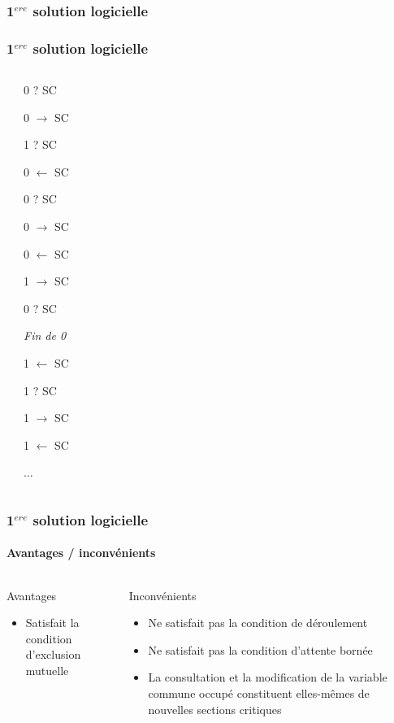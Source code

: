 \begin{frame}
\frametitle{1$^{ere}$ solution logicielle}
\begin{scriptsize}\end{scriptsize}
\end{frame}

\begin{frame}
\frametitle{1$^{ere}$ solution logicielle}
\begin{columns}
\begin{scriptsize}\end{scriptsize}
\begin{itemize}
\begin{scriptsize}
\item 0 ? SC
\item 0 $\rightarrow$ SC
\item 1 ? SC
\item 0 $\leftarrow$ SC
\item 0 ? SC
\item 0 $\rightarrow$ SC
\item 0 $\leftarrow$ SC
\item 1 $\rightarrow$ SC
\item 0 ? SC
\item \textit{Fin de 0}
\item 1 $\leftarrow$ SC
\item 1 ? SC
\item 1 $\rightarrow$ SC
\item 1 $\leftarrow$ SC
\item ...
\end{scriptsize}
\end{itemize}
\end{columns}
\end{frame}

\begin{frame}
\frametitle{1$^{ere}$ solution logicielle}
\framesubtitle{Avantages / inconvénients}
\begin{columns}
\begin{block}{Avantages}
\begin{itemize}
\item Satisfait la condition d’exclusion mutuelle
\end{itemize}
\end{block}
\begin{block}{Inconvénients}
\begin{itemize}
\item Ne satisfait pas la condition de déroulement
\item Ne satisfait pas la condition d’attente bornée
\item La consultation et la modification de la variable commune occupé constituent elles-mêmes de nouvelles sections critiques
\end{itemize}
\end{block}
\end{columns}
\end{frame}

